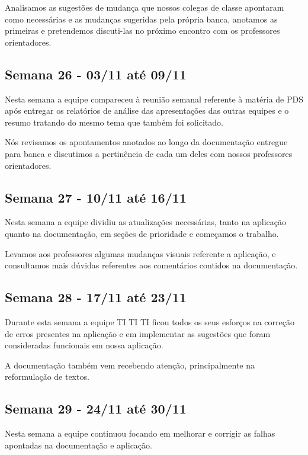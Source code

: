 \begin{apendicesenv}
\begin{flushleft}
Analisamos as sugestões de mudança que nossos colegas de classe apontaram como necessárias e as mudanças sugeridas pela própria banca, anotamos as primeiras e pretendemos discuti-las no próximo encontro com os professores orientadores.
\end{flushleft}

\begin{flushleft}
 \section{Semana 26 - 03/11 até 09/11}
Nesta semana a equipe compareceu à reunião semanal referente à matéria de PDS após entregar os relatórios de análise das apresentações das outras equipes e o resumo tratando do mesmo tema que também foi solicitado.

Nós revisamos os apontamentos anotados ao longo da documentação entregue para banca e discutimos a pertinência de cada um deles com nossos professores orientadores.
\end{flushleft}

\begin{flushleft}
 \section{Semana 27 - 10/11 até 16/11}
 Nesta semana a equipe dividiu as atualizações necessárias, tanto na aplicação quanto na documentação, em seções de prioridade e começamos o trabalho.

Levamos aos professores algumas mudanças visuais referente a aplicação, e consultamos mais dúvidas referentes aos comentários contidos na documentação.
\end{flushleft}

\begin{flushleft}
 \section{Semana 28 - 17/11 até 23/11}
 Durante esta semana a equipe TI TI TI ficou todos os seus esforços na correção de erros presentes na aplicação e em implementar as sugestões que foram consideradas funcionais em nossa aplicação.

A documentação também vem recebendo atenção, principalmente na reformulação de textos.
\end{flushleft}


\begin{flushleft}
 \section{Semana 29 - 24/11 até 30/11}
Nesta semana a equipe continuou focando em melhorar e corrigir as falhas apontadas na documentação e aplicação.


\end{flushleft}
\end{apendicesenv}
